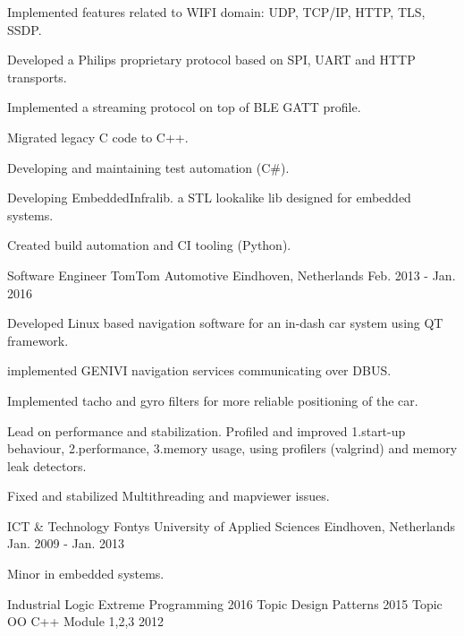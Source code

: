 \begin{cventries}
{\begin{cvitems}
        \item {Implemented features related to WIFI domain: UDP, TCP/IP, HTTP, TLS, SSDP.}
        \item {Developed a Philips proprietary protocol based on SPI, UART and HTTP transports.}
        \item {Implemented a streaming protocol on top of BLE GATT profile.}
        \item {Migrated legacy C code to C++.}
        \item {Developing and maintaining test automation (C\#).}
        \item {Developing EmbeddedInfralib. a STL lookalike lib designed for embedded systems.}
        \item {Created build automation and CI tooling (Python).}
      \end{cvitems}
    }
  \cventry
    {Software Engineer}
    {TomTom Automotive}
    {Eindhoven, Netherlands}
    {Feb. 2013 - Jan. 2016}
    {
      \begin{cvitems}
        \item {Developed Linux based navigation software for an in-dash car system using QT framework.}
        \item{implemented GENIVI navigation services communicating over DBUS.}
        \item {Implemented tacho and gyro filters for more reliable positioning of the car. }
        \item {Lead on performance and stabilization. Profiled and improved 1.start-up behaviour, 2.performance, 3.memory usage, using profilers (valgrind) and memory leak detectors.}
        \item {Fixed and stabilized Multithreading and mapviewer issues.}
      \end{cvitems}
    }
\end{cventries}
\newpage


\begin{cventries}
  \cventry
    {ICT \& Technology}
    {Fontys University of Applied Sciences}
    {Eindhoven, Netherlands}
    {Jan. 2009 - Jan. 2013}
    {
      \begin{cvitems}
        \item {Minor in embedded systems.}
      \end{cvitems}
    }
\end{cventries}
\begin{cventries}
  \cventry
    {Industrial Logic}
    {Extreme Programming}
    {}
    {2016}
    {}
      \cventry
    {Topic}
    {Design Patterns}
    {}
    {2015}
    {}
      \cventry
    {Topic}
    {OO C++ Module 1,2,3}
    {}
    {2012}
    {}
\end{cventries}

